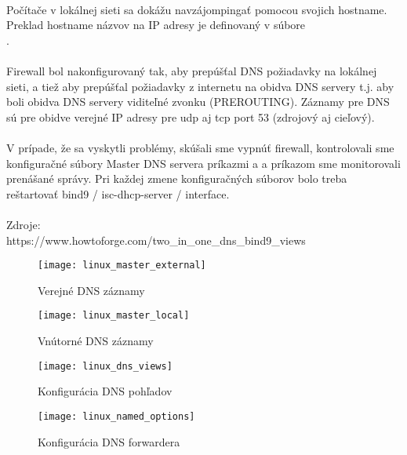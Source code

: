 \paragraph{}
Počítače v lokálnej sieti sa dokážu navzájompingať pomocou svojich hostname. Preklad hostname názvov na IP adresy je definovaný v súbore\\ .
\paragraph{}
Firewall bol nakonfigurovaný tak, aby prepúšťal DNS požiadavky na lokálnej sieti, a tiež aby prepúšťal požiadavky z internetu na obidva DNS servery t.j. aby boli obidva DNS servery viditeľné zvonku (PREROUTING). Záznamy pre DNS sú pre obidve verejné IP adresy pre udp aj tcp port 53 (zdrojový aj cieľový).
\paragraph{}
V prípade, že sa vyskytli problémy, skúšali sme vypnúť firewall, kontrolovali sme konfiguračné súbory Master DNS servera príkazmi  a  a príkazom  sme monitorovali prenášané správy. Pri každej zmene konfiguračných súborov bolo treba reštartovať bind9 / isc-dhcp-server / interface.
\\
\\
\noindent
Zdroje:\\
\noindent
https://www.howtoforge.com/two\_in\_one\_dns\_bind9\_views\\

\begin{figure}[!htb]
\centering
\texttt{[image: linux\_master\_external]}
\caption{Verejné DNS záznamy}
\label{fig:x dns_external}
\end{figure}

\begin{figure}[!htb]
\centering
\texttt{[image: linux\_master\_local]}
\caption{Vnútorné DNS záznamy}
\label{fig:x dns_internal}
\end{figure}

\begin{figure}[!htb]
\centering
\texttt{[image: linux\_dns\_views]}
\caption{Konfigurácia DNS pohľadov}
\label{fig:x dns_views}
\end{figure}

\begin{figure}[!htb]
\centering
\texttt{[image: linux\_named\_options]}
\caption{Konfigurácia DNS forwardera}
\label{fig:x dns_forwarder}
\end{figure}



